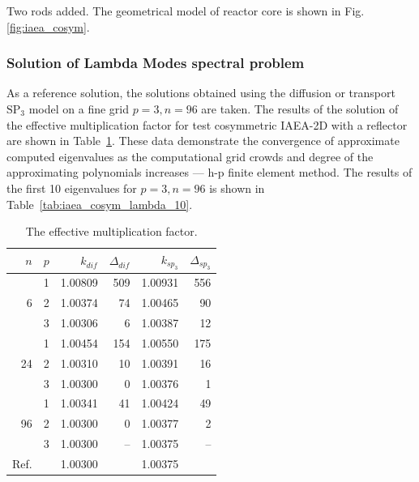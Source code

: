 \documentclass[authoryear]{elsarticle}
\begin{document}
Two rods added.
The geometrical model of reactor core is shown in Fig. \ref{fig:iaea_cosym}. 

\subsubsection{Solution of Lambda Modes spectral problem}
As a reference solution, the solutions obtained using the diffusion or transport $\mathrm{SP_3}$ model on a fine grid $ p = 3, n = 96 $ are taken.
The results of the solution of the effective multiplication factor for test cosymmetric IAEA-2D with a reflector are shown in Table~\ref{tab:iaea_cosym_lambda}. 
These data demonstrate the convergence of approximate computed eigenvalues as the computational grid crowds and degree of the approximating polynomials increases --- h-p finite element method.
The results of the first 10 eigenvalues for $ p = 3, n = 96 $ is shown in Table~\ref{tab:iaea_cosym_lambda_10}.

\begin{table}[H]
\caption{The effective multiplication factor.}
\label{tab:iaea_cosym_lambda}
\begin{center}
\begin{tabular}{r r r r r r}
\hline
$n$ & $p$ & $k_{dif}$ & $\Delta_{dif}$ &$k_{sp_3}$& $\Delta_{sp_3}$ \\
\hline
	& 1	& 1.00809& 509& 1.00931& 556\\
6	& 2	& 1.00374&  74& 1.00465&  90\\
	& 3	& 1.00306&   6& 1.00387&  12\\
\hline
	& 1	& 1.00454& 154& 1.00550& 175\\
24& 2	& 1.00310&  10& 1.00391&  16\\
	& 3	& 1.00300&   0& 1.00376&   1\\ 
\hline
	& 1	& 1.00341&  41& 1.00424&  49\\
96& 2	& 1.00300&   0& 1.00377&   2\\
	& 3	& 1.00300&  --& 1.00375&  --\\ 
\hline
Ref.&   & 1.00300&    & 1.00375&    \\ 
\hline
\end{tabular}
\end{center}
\end{table}
\end{document}
